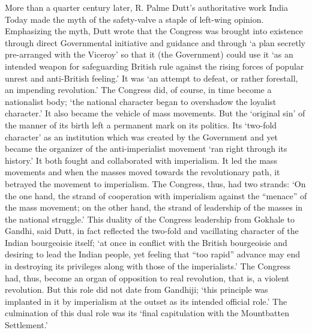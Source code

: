\begin{multicols}{2}
More than a quarter century later, R. Palme Dutt's authoritative work India Today made the myth of the safety-valve a staple of left-wing opinion. Emphasizing the myth, Dutt wrote that the Congress was brought into existence through direct Governmental initiative and guidance and through `a plan secretly pre-arranged with the Viceroy' so that it (the Government) could use it `as an intended weapon for safeguarding British rule against the rising forces of popular unrest and anti-British feeling.' It was `an attempt to defeat, or rather forestall, an impending revolution.' The Congress did, of course, in time become a nationalist body; `the national character began to overshadow the loyalist character.' It also became the vehicle of mass movements. But the `original sin' of the manner of its birth left a permanent mark on its politics. Its `two-fold character' as an institution which was created by the Government and yet became the organizer of the anti-imperialist movement `ran right through its history.' It both fought and collaborated with imperialism. It led the mass movements and when the masses moved towards the revolutionary path, it betrayed the movement to imperialism. The Congress, thus, had two strands: `On the one hand, the strand of cooperation with imperialism against the ``menace'' of the mass movement; on the other hand, the strand of leadership of the masses in the national struggle.' This duality of the Congress leadership from Gokhale to Gandhi, said Dutt, in fact reflected the two-fold and vacillating character of the Indian bourgeoisie itself; `at once in conflict with the British bourgeoisie and desiring to lead the Indian people, yet feeling that ``too rapid'' advance may end in destroying its privileges along with those of the imperialists.' The Congress had, thus, become an organ of opposition to real revolution, that is, a violent revolution. But this role did not date from Gandhiji; `this principle was implanted in it by imperialism at the outset as its intended official role.' The culmination of this dual role was its `final capitulation with the Mountbatten Settlement.'


\end{multicols}
